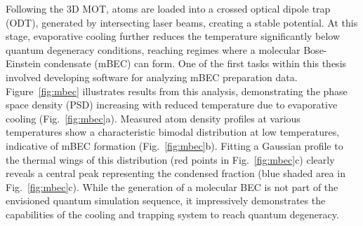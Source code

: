 Following the 3D MOT, atoms are loaded into a crossed optical dipole trap (ODT), generated by intersecting laser beams, creating a stable potential. At this stage, evaporative cooling further reduces the temperature significantly below quantum degeneracy conditions, reaching regimes where a molecular Bose-Einstein condensate (mBEC) can form. One of the first tasks within this thesis involved developing software for analyzing mBEC preparation data. Figure~\ref{fig:mbec} illustrates results from this analysis, demonstrating the phase space density (PSD) increasing with reduced temperature due to evaporative cooling (Fig.~\ref{fig:mbec}a). Measured atom density profiles at various temperatures show a characteristic bimodal distribution at low temperatures, indicative of mBEC formation (Fig.~\ref{fig:mbec}b). Fitting a Gaussian profile to the thermal wings of this distribution (red points in Fig.~\ref{fig:mbec}c) clearly reveals a central peak representing the condensed fraction (blue shaded area in Fig.~\ref{fig:mbec}c). While the generation of a molecular BEC is not part of the envisioned quantum simulation sequence, it impressively demonstrates the capabilities of the cooling and trapping system to reach quantum degeneracy.

